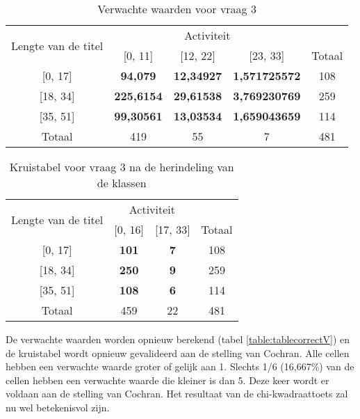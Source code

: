 {\begin{table}[]
	\centering
	\begin{tabular}{|c|c|c|c|c|}
		\hline
		\multirow{2}{*}{Lengte van de titel} & \multicolumn{3}{c|}{Activiteit}            & \multicolumn{1}{l|}{} \\ \cline{2-5} 
		& {[}0, 11{]}  & {[}12, 22{]} & {[}23, 33{]} & Totaal                \\ \hline
		{[}0, 17{]}                          & \textbf{94,079}  & \textbf{12,34927}   & \textbf{1,571725572}   & 108                   \\ \hline
		{[}18, 34{]}                         & \textbf{225,6154} & \textbf{29,61538}  & \textbf{3,769230769}   & 259                   \\ \hline
		{[}35, 51{]}                         & \textbf{99,30561} & \textbf{13,03534}  & \textbf{1,659043659}   & 114                   \\ \hline
		Totaal                               & 419          & 55           & 7            & 481                   \\ \hline
	\end{tabular}
	\caption{Verwachte waarden voor vraag 3}
	\label{table:tablewrongV}
\end{table}

\begin{table}[]
	\centering
	\begin{tabular}{|c|c|c|c|}
		\hline
		\multirow{2}{*}{Lengte van de titel} & \multicolumn{2}{c|}{Activiteit} & \multicolumn{1}{l|}{} \\ \cline{2-4} 
		& {[}0, 16{]}    & {[}17, 33{]}   & Totaal                \\ \hline
		{[}0, 17{]}                          & \textbf{101}   & \textbf{7}     & 108                   \\ \hline
		{[}18, 34{]}                         & \textbf{250}   & \textbf{9}     & 259                   \\ \hline
		{[}35, 51{]}                         & \textbf{108}   & \textbf{6}     & 114                   \\ \hline
		Totaal                               & 459            & 22             & 481                   \\ \hline
	\end{tabular}
	\caption{Kruistabel voor vraag 3 na de herindeling van de klassen}
	\label{table:tablecorrect}
\end{table}

De verwachte waarden worden opnieuw berekend (tabel \ref{table:tablecorrectV}) en de kruistabel wordt opnieuw gevalideerd aan de stelling van Cochran. Alle cellen hebben een verwachte waarde groter of gelijk aan 1. Slechts 1/6 (16,667\%) van de cellen hebben een verwachte waarde die kleiner is dan 5. Deze keer wordt er voldaan aan de stelling van Cochran. Het resultaat van de chi-kwadraattoets zal nu wel betekenisvol zijn.

}
